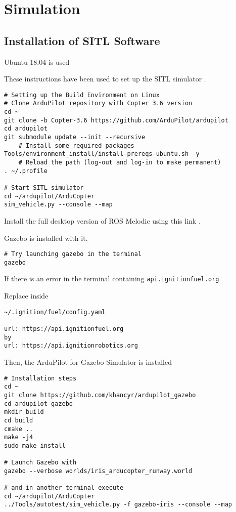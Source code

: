 \section{Simulation}

\subsection{Installation of SITL Software}
Ubuntu 18.04 is used

These instructions have been used to set up the SITL simulator \cite{ardupilot_sitl}.

\begin{verbatim}
# Setting up the Build Environment on Linux
# Clone ArduPilot repository with Copter 3.6 version
cd ~
git clone -b Copter-3.6 https://github.com/ArduPilot/ardupilot
cd ardupilot
git submodule update --init --recursive
    # Install some required packages
Tools/environment_install/install-prereqs-ubuntu.sh -y
    # Reload the path (log-out and log-in to make permanent)
. ~/.profile

# Start SITL simulator
cd ~/ardupilot/ArduCopter
sim_vehicle.py --console --map
\end{verbatim}

Install the full desktop version of ROS Melodic using this link \cite{ros_install}.

Gazebo is installed with it.

\begin{verbatim}
# Try launching gazebo in the terminal
gazebo
            \end{verbatim}

If there is an error in the terminal containing \texttt{api.ignitionfuel.org}.

Replace inside
\begin{verbatim}
~/.ignition/fuel/config.yaml

url: https://api.ignitionfuel.org
by
url: https://api.ignitionrobotics.org
\end{verbatim}

Then, the ArduPilot for Gazebo Simulator is installed
\begin{verbatim}
# Installation steps
cd ~
git clone https://github.com/khancyr/ardupilot_gazebo
cd ardupilot_gazebo
mkdir build
cd build
cmake ..
make -j4
sudo make install

# Launch Gazebo with
gazebo --verbose worlds/iris_arducopter_runway.world

# and in another terminal execute
cd ~/ardupilot/ArduCopter
../Tools/autotest/sim_vehicle.py -f gazebo-iris --console --map
\end{verbatim}

